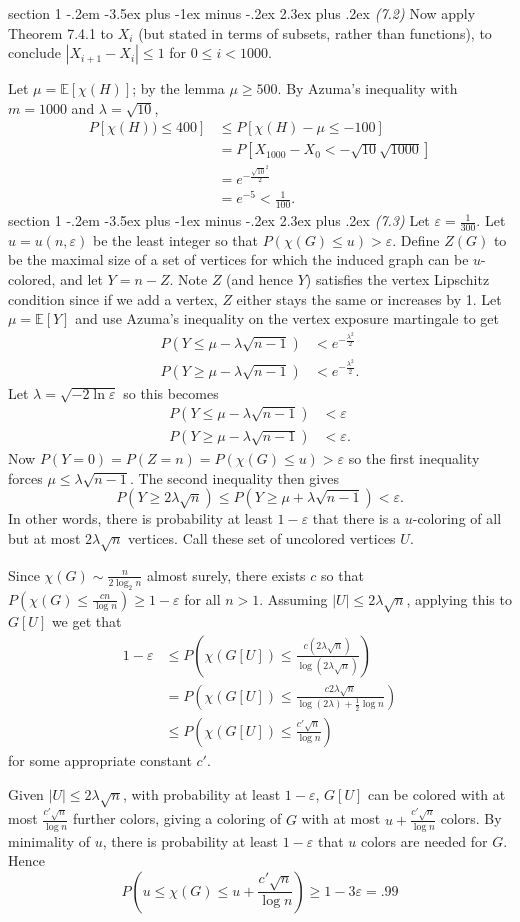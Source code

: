 \documentclass[12pt]{article}
\makeatletter
\theoremstyle{norm}
\newcommand{\E}[0]{\mathbb{E}}
\newcommand{\rc}[1]{\frac{1}{#1}}
\newcommand{\ep}[0]{\varepsilon}
\newcommand{\la}[0]{\lambda}
\newcommand{\pa}[1]{\left( {#1} \right)}
\newenvironment{problem}{\@startsection
       {section}
       {1}
       {-.2em}
       {-3.5ex plus -1ex minus -.2ex}
       {2.3ex plus .2ex}
       {\pagebreak[3]%
       \large\bf\noindent{Problem }
       }
       }
       {%
       }
\makeatother
\begin{document}
\begin{problem} {\it (7.2)}
Now apply Theorem 7.4.1 to $X_i$ (but stated in terms of subsets, rather than functions), to conclude $|X_{i+1}-X_i|\le 1$ for $0\le i<1000$. 

Let $\mu=\E[\chi(H)]$; by the lemma $\mu\ge 500$.
By Azuma's inequality with $m=1000$ and $\la=\sqrt{10}$,
\begin{align*}
P[\chi(H))\le 400]&\le P[\chi(H)-\mu\le -100]\\
&=P[X_{1000}-X_0<-\sqrt{10}\sqrt{1000}]\\
&=e^{-\frac{\sqrt{10}^2}{2}}\\
&=e^{-5}<\rc{100}.
\end{align*}
\end{problem}
\begin{problem} {\it (7.3)}
Let $\ep=\rc{300}$. Let $u=u(n,\ep)$ be the least integer so that $P(\chi(G)\le u)>\ep$. Define $Z(G)$ to be the maximal size of a set of vertices for which the induced graph can be $u$-colored, and let $Y=n-Z$. Note $Z$ (and hence $Y$) satisfies the vertex Lipschitz condition since if we add a vertex, $Z$ either stays the same or increases by 1. Let $\mu=\E[Y]$ and use Azuma's inequality on the vertex exposure martingale to get
\begin{align*}
P(Y\le \mu-\la\sqrt{n-1})&<e^{-\frac{\la^2}2}\\
P(Y\ge \mu-\la\sqrt{n-1})&<e^{-\frac{\la^2}2}.
\end{align*}
Let $\la=\sqrt{-2\ln \ep}$ so this becomes
\begin{align*}
P(Y\le \mu-\la\sqrt{n-1})&<\ep\\
P(Y\ge \mu-\la\sqrt{n-1})&<\ep.
\end{align*}
Now $P(Y=0)=P(Z=n)=P(\chi(G)\le u)>\ep$ so the first inequality forces $\mu\le \la\sqrt{n-1}$. The second inequality then gives
\[
P(Y\ge 2\la\sqrt{n})\le P(Y\ge \mu+\la\sqrt{n-1})< \ep.
\]
In other words, there is probability at least $1-\ep$ that there is a $u$-coloring of all but at most $2\la\sqrt n$ vertices. Call these set of uncolored vertices $U$.

Since $\chi(G)\sim \frac{n}{2\log_2 n}$ almost surely, there exists $c$ so that $P\pa{\chi(G)\le \frac{cn}{\log n}}\ge 1-\ep$ for all $n>1$. Assuming $|U|\le 2\la \sqrt n$, applying this to $G[U]$ we get that
\begin{align*}
1-\ep&\le 
P\pa{\chi(G[U])\le \frac{c(2\la\sqrt n)}{\log(2\la\sqrt n)}}\\
&=P\pa{\chi(G[U])\le \frac{c2\la\sqrt n}{\log (2\la)+\rc 2\log{ n}}}\\
&\le P\pa{\chi(G[U])\le \frac{c' \sqrt n}{\log n}}
\end{align*}
for some appropriate constant $c'$.

Given $|U|\le 2\la \sqrt n$, with probability at least $1-\ep$, $G[U]$ can be colored with at most $\frac{c'\sqrt n}{\log n}$ further colors, giving a coloring of $G$ with at most $u+\frac{c'\sqrt n}{\log n}$ colors. By minimality of $u$, there is probability at least $1-\ep$ that $u$ colors are needed for $G$. Hence
\[
P\pa{u\le \chi(G)\le u+\frac{c'\sqrt n}{\log n}}\ge 1-3\ep=.99
\]
\end{problem}
\end{document}
